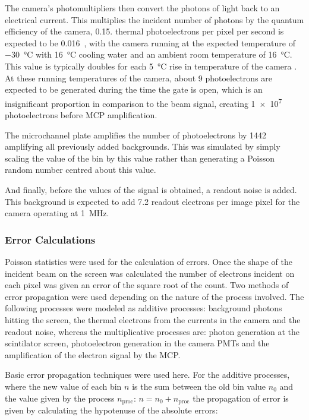 The camera's photomultipliers then convert the photons of light back to an
electrical current. This multiplies the incident number of photons by the
quantum efficiency of the camera, \num{0.15}. %
thermal photoelectrons per pixel per second is expected to be
\num{0.016}~\cite{istarscmos}, with the camera running at the expected
temperature of \SI{-30}{\celsius} with \SI{16}{\celsius} cooling water and an
ambient room temperature of \SI{16}{\celsius}. This value is typically doubles
for each \SI{5}{\celsius} rise in temperature of the camera \cite{istarscmos}.
At these running temperatures of the camera, about 9 photoelectrons are expected
to be generated during the time the gate is open, which is an insignificant
proportion in comparison to the beam signal, creating \num{1e7} photoelectrons
before MCP amplification.

The microchannel plate amplifies the number of photoelectrons by \num{1442}
amplifying all previously added backgrounds.
This was simulated by simply scaling the value of the bin by this value rather
than generating a Poisson random number centred about this value.

And finally, before the values of the signal is obtained, a readout noise is
added. This background is expected to add \num{7.2} readout electrons per image
pixel for the camera operating at \SI{1}{\mega\hertz}.

\subsubsection{Error Calculations}

Poisson statistics were used for the calculation of errors.  Once the shape of
the incident beam on the screen was calculated the number of electrons incident
on each pixel was given an error of the square root of the count. Two methods of
error propagation were used depending on the nature of the process involved.
The following processes were modeled as additive processes: background photons
hitting the screen, the thermal electrons from the currents in the camera and
the readout noise, whereas the multiplicative processes are: photon generation
at the scintilator screen, photoelectron generation in the camera PMTs and the
amplification of the electron signal by the MCP.

Basic error propagation techniques were used here. For the additive processes,
where the new value of each bin $n$ is the sum between the old bin value $n_0$
and the value given by the process $n_\text{proc}$: $n=n_0+n_\text{proc}$ the
propagation of error is given by calculating the hypotenuse of the absolute
errors:

